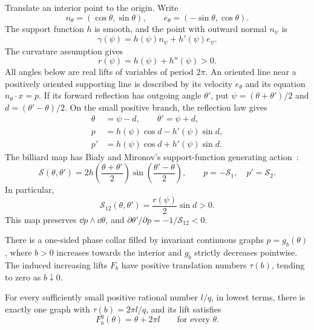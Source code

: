 Translate an interior point to the origin.  Write
\[
n_\theta=(\cos\theta,\sin\theta),\qquad
e_\theta=(-\sin\theta,\cos\theta).
\]
The support function \(h\) is smooth, and the point with outward normal
\(n_\psi\) is
\[
\gamma(\psi)=h(\psi)n_\psi+h'(\psi)e_\psi.
\]
The curvature assumption gives
\[
r(\psi)=h(\psi)+h''(\psi)>0.
\]
All angles below are real lifts of variables of period \(2\pi\).
An oriented line near a positively oriented supporting line is described
by its velocity \(e_\theta\) and its equation \(n_\theta\cdot x=p\).
If its forward reflection has outgoing angle \(\theta'\), put
\(\psi=(\theta+\theta')/2\) and \(d=(\theta'-\theta)/2\).  On the small
positive branch, the reflection law gives
\[
\begin{split}
\theta&=\psi-d,\qquad \theta'=\psi+d,\\
p&=h(\psi)\cos d-h'(\psi)\sin d,\\
p'&=h(\psi)\cos d+h'(\psi)\sin d.
\end{split}
\]
The billiard map has Bialy and Mironov's support-function generating
action~\cite{BM2017}:
\begin{equation}\label{ana:line-generating-function}
\mathcal S(\theta,\theta')
=2h\left(\frac{\theta+\theta'}2\right)
 \sin\left(\frac{\theta'-\theta}2\right),
\qquad
p=-\mathcal S_1,\quad p'=\mathcal S_2.
\end{equation}
In particular,
\begin{equation}\label{ana:twist}
\mathcal S_{12}(\theta,\theta')
=\frac{r(\psi)}2\sin d>0.
\end{equation}
This map preserves \(\dd p\wedge\dd\theta\), and
\(\partial\theta'/\partial p=-1/\mathcal S_{12}<0\).

\begin{lemma}\label{lem:rational-periodicity}
There is a one-sided phase collar filled by invariant continuous graphs
\(p=g_b(\theta)\), where \(b>0\) increases towards the interior and
\(g_b\) strictly decreases pointwise.  The induced increasing lifts
\(F_b\) have positive translation numbers \(\tau(b)\), tending to zero
as \(b\downarrow0\).

For every sufficiently small positive rational number \(l/q\), in lowest
terms, there is exactly one graph with
\(\tau(b)=2\pi l/q\), and its lift satisfies
\begin{equation}\label{ana:rational-identity}
F_b^q(\theta)=\theta+2\pi l
\qquad\text{for every }\theta.
\end{equation}
\end{lemma}

